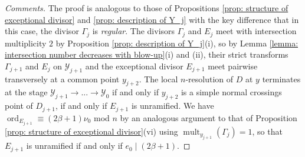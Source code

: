 \documentclass[12pt]{amsart}
\numberwithin{equation}{section}
\theoremstyle{definition}
\newcommand{\Y}{\mathcal{Y}}
\DeclareMathOperator{\mult}{mult}
\DeclareMathOperator{\ord}{ord}
\begin{document}
\begin{proof}[Comments]
    The proof is analogous to those of Propositions \ref{prop: structure of exceptional divisor} and \ref{prop: description of Y_j} with the key difference that in this case, the divisor $\Gamma_j$ is \textit{regular}. The divisors $\Gamma_j$ and $E_j$ meet with intersection multiplicity $2$ by Proposition \ref{prop: description of Y_j}(i), so by Lemma \ref{lemma: intersection number decreases with blow-up}(i) and (ii), their strict transforms $\Gamma_{j+1}$ and $E_j$ on $\Y_{j+1}$ and the exceptional divisor $E_{j+1}$ meet pairwise transversely at a common point $y_{j+2}$. The local $n$-resolution of $D$ at $y$ terminates at the stage $\Y_{j+1}\to...\to\Y_0$ if and only if $y_{j+2}$ is a simple normal crossings point of $D_{j+1}$, if and only if $E_{j+1}$ is unramified. We have $\ord_{E_{j+1}}\equiv(2\beta+1)\nu_0$ mod $n$ by an analogous argument to that of Proposition \ref{prop: structure of exceptional divisor}(vi) using $\mult_{y_{j+1}}(\Gamma_j)=1$, so that $E_{j+1}$ is unramified if and only if $e_0\mid(2\beta+1)$. 
\end{proof}
\end{document}
